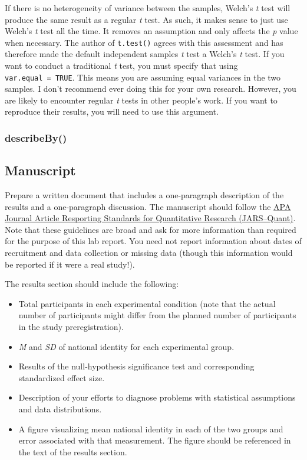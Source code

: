 \documentclass[
]{book}
\providecommand{\tightlist}{%
  \setlength{\itemsep}{0pt}\setlength{\parskip}{0pt}}
\begin{document}
If there is no heterogeneity of variance between the samples, Welch's \emph{t} test will produce the same result as a regular \emph{t} test. As such, it makes sense to just use Welch's \emph{t} test all the time. It removes an assumption and only affects the \emph{p} value when necessary. The author of \texttt{t.test()} agrees with this assessment and has therefore made the default independent samples \emph{t} test a Welch's \emph{t} test. If you want to conduct a traditional \emph{t} test, you must specify that using \texttt{var.equal\ =\ TRUE}. This means you are assuming equal variances in the two samples. I don't recommend ever doing this for your own research. However, you are likely to encounter regular \emph{t} tests in other people's work. If you want to reproduce their results, you will need to use this argument.

\hypertarget{describeby}{%
\subsubsection{describeBy()}\label{describeby}}

\hypertarget{manuscript}{%
\subsection{Manuscript}\label{manuscript}}

Prepare a written document that includes a one-paragraph description of the results and a one-paragraph discussion. The manuscript should follow the \href{https://apastyle.apa.org/jars/quantitative}{APA Journal Article Resporting Standards for Quantitative Research (JARS--Quant)}. Note that these guidelines are broad and ask for more information than required for the purpose of this lab report. You need not report information about dates of recruitment and data collection or missing data (though this information would be reported if it were a real study!).

The results section should include the following:

\begin{itemize}
\tightlist
\item
  Total participants in each experimental condition (note that the actual number of participants might differ from the planned number of participants in the study preregistration).
\item
  \emph{M} and \emph{SD} of national identity for each experimental group.
\item
  Results of the null-hypothesis significance test and corresponding standardized effect size.
\item
  Description of your efforts to diagnose problems with statistical assumptions and data distributions.
\item
  A figure visualizing mean national identity in each of the two groups and error associated with that measurement. The figure should be referenced in the text of the results section.
\end{itemize}
\end{document}

